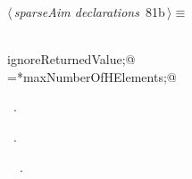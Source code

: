 \documentclass{article}
\begin{document}
\begin{flushleft} \small
\begin{minipage}{\linewidth}\label{scrap135}\raggedright\small
{} $\langle\,${\itshape sparseAim declarations}\nobreak\ {\footnotesize {81b}}$\,\rangle\equiv$
\vspace{-1ex}
\begin{list}{}{} \item
\mbox{}\verb@@\\
\mbox{}\verb@int ignoreReturnedValue;@\\
\mbox{}\verb@originalMaxHElements=*maxNumberOfHElements;@\\
\mbox{}\verb@@{\NWsep}
\end{list}
\vspace{-1.5ex}
\footnotesize
\begin{list}{}{\setlength{\itemsep}{-\parsep}\setlength{\itemindent}{-\leftmargin}}
\item \NWtxtMacroDefBy\ .
\item \NWtxtMacroRefIn\ .
\item \NWtxtIdentsUsed\nobreak\  \verb@maxNumberOfHElements@\nobreak\ .
\item{}
\end{list}
\end{minipage}\vspace{4ex}
\end{flushleft}
\end{document}
